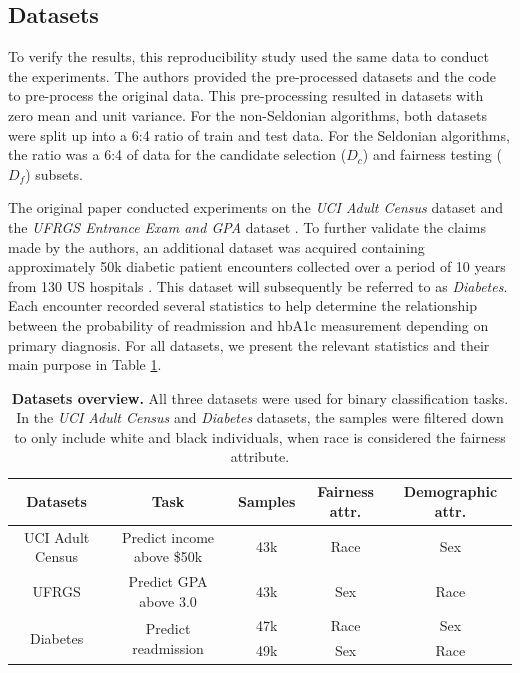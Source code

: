 \subsection{Datasets}\label{sec:datasets}
To verify the results, this reproducibility study used the same data to conduct the experiments. The authors provided the pre-processed datasets and the code to pre-process the original data. This pre-processing resulted in datasets with zero mean and unit variance. For the non-Seldonian algorithms, both datasets were split up into a 6:4 ratio of train and test data. For the Seldonian algorithms, the ratio was a 6:4 of data for the candidate selection ($D_c$) and fairness testing ($D_f$) subsets. 

The original paper conducted experiments on the \textit{UCI Adult Census} dataset \cite{adult_dataset} and the \textit{UFRGS Entrance Exam and GPA} dataset \cite{gpa_dataset}. To further validate the claims made by the authors, an additional dataset was acquired containing approximately 50k diabetic patient encounters collected over a period of 10 years from 130 US hospitals \cite{strack2014impact}. This dataset will subsequently be referred to as \textit{Diabetes}. Each encounter recorded several statistics to help determine the relationship between the probability of readmission and hbA1c measurement depending on primary diagnosis. For all datasets, we present the relevant statistics and their main purpose in Table \ref{tab:datasets}.

\begin{table}[ht]
    \centering
    \footnotesize
    \begin{tabular}{c|c|c|c|c}
       Datasets & Task & Samples & Fairness attr. & Demographic attr. \\\hline
       UCI Adult Census \cite{adult_dataset} & Predict income above \$50k & 43k & Race & Sex \\
       UFRGS \cite{gpa_dataset} & Predict GPA above 3.0 & 43k & Sex & Race \\ 
       \multirow{2}{*}{Diabetes \cite{strack2014impact}} & \multirow{2}{*}{Predict readmission} & 47k & Race & Sex \\
       & & 49k & Sex & Race \\%
    \end{tabular}
    \caption{\textbf{Datasets overview.} All three datasets were used for binary classification tasks. In the \textit{UCI Adult Census} and \textit{Diabetes} datasets, the samples were filtered down to only include white and black individuals, when race is considered the fairness attribute.}
    \label{tab:datasets}
\end{table}


